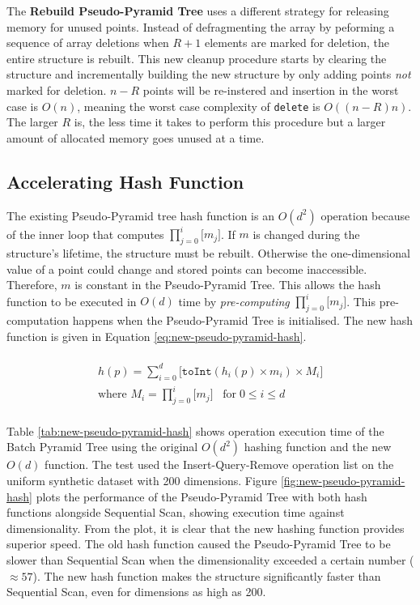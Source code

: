 The \textbf{Rebuild Pseudo-Pyramid Tree} uses a different strategy for releasing memory for unused points. Instead of defragmenting the array by peforming a sequence of array deletions when $R + 1$ elements are marked for deletion, the entire structure is rebuilt. This new cleanup procedure starts by clearing the structure and incrementally building the new structure by only adding points \textit{not} marked for deletion. $n - R$ points will be re-instered and insertion in the worst case is $O(n)$, meaning the worst case complexity of \texttt{delete} is $O((n - R)n)$. The larger $R$ is, the less time it takes to perform this procedure but a larger amount of allocated memory goes unused at a time.

\subsection{Accelerating Hash Function}

The existing Pseudo-Pyramid tree hash function is an $O(d^2)$ operation because of the inner loop that computes $\prod_{j=0}^{i}{\lbrack m_j \rbrack}$. If $m$ is changed during the structure's lifetime, the structure must be rebuilt. Otherwise the one-dimensional value of a point could change and stored points can become inaccessible. Therefore, $m$ is constant in the Pseudo-Pyramid Tree. This allows the hash function to be executed in $O(d)$ time by \textit{pre-computing} $\prod_{j=0}^{i}{\lbrack m_j \rbrack}$. This pre-computation happens when the Pseudo-Pyramid Tree is initialised. The new hash function is given in Equation \ref{eq:new-pseudo-pyramid-hash}.

\begin{multline}\\
	h(p) = \sum_{i = 0}^{d} { \lbrack \texttt{toInt}( h_i(p) \times m_i ) \times M_i \rbrack } \\
	\text{where } M_i = \prod_{j=0}^{i}{\lbrack m_j \rbrack} \;\;\; \text{for} \; 0 \leq i \leq d \\
	\label{eq:new-pseudo-pyramid-hash}
\end{multline}

Table \ref{tab:new-pseudo-pyramid-hash} shows operation execution time of the Batch Pyramid Tree using the original $O(d^2)$ hashing function and the new $O(d)$ function. The test used the Insert-Query-Remove operation list on the uniform synthetic dataset with 200 dimensions. Figure \ref{fig:new-pseudo-pyramid-hash} plots the performance of the Pseudo-Pyramid Tree with both hash functions alongside Sequential Scan, showing execution time against dimensionality. From the plot, it is clear that the new hashing function provides superior speed. The old hash function caused the Pseudo-Pyramid Tree to be slower than Sequential Scan when the dimensionality exceeded a certain number ($\approx 57$). The new hash function makes the structure significantly faster than Sequential Scan, even for dimensions as high as 200.

